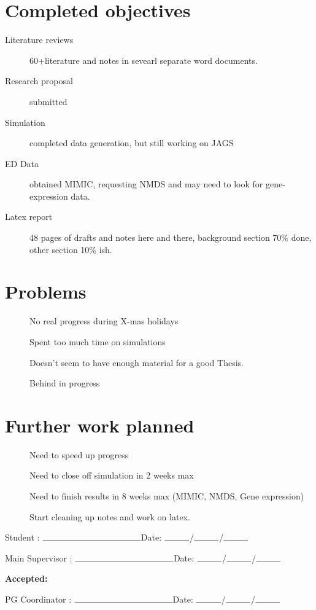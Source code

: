 \documentclass[12pt, twoside]{article}
\begin{document}
\section*{Completed objectives}
\begin{description}
	\item[Literature reviews] 60+literature and notes in sevearl separate word documents. 
	\item[Research proposal] submitted
	\item[Simulation] completed data generation, but still working on JAGS
	\item[ED Data] obtained MIMIC, requesting NMDS and may need to look for gene-expression data. 
	\item[Latex report] 48 pages of drafts and notes here and there, background section 70\% done, other section 10\% ish. 
\end{description}

\section*{Problems}
\begin{description}
	\item[] No real progress during X-mas holidays
	\item[] Spent too much time on simulations
	\item[] Doesn't seem to have enough material for a good Thesis. 
	\item[] Behind in progress
\end{description}

\section*{Further work planned}
\begin{description}
	\item[] Need to speed up progress
	\item[] Need to close off simulation in 2 weeks max 
	\item[] Need to finish results in 8 weeks max (MIMIC, NMDS, Gene expression)
	\item[] Start cleaning up notes and work on latex. 
\end{description}

\vspace{5cm}
			
\begin{flushright}
	Student : $\rule{4cm}{0.15mm}$\hspace{2cm}Date: $\rule{1cm}{0.15mm}$/$\rule{1cm}{0.15mm}$/$\rule{1cm}{0.15mm}$
	\bigbreak
	
	Main Supervisor : $\rule{4cm}{0.15mm}$\hspace{2cm}Date: $\rule{1cm}{0.15mm}$/$\rule{1cm}{0.15mm}$/$\rule{1cm}{0.15mm}$
	\bigbreak
	
	\textbf{Accepted: \hspace{13cm}}
	
	\bigbreak
	PG Coordinator : $\rule{4cm}{0.15mm}$\hspace{2cm}Date: $\rule{1cm}{0.15mm}$/$\rule{1cm}{0.15mm}$/$\rule{1cm}{0.15mm}$
	
\end{flushright}
\end{document}
